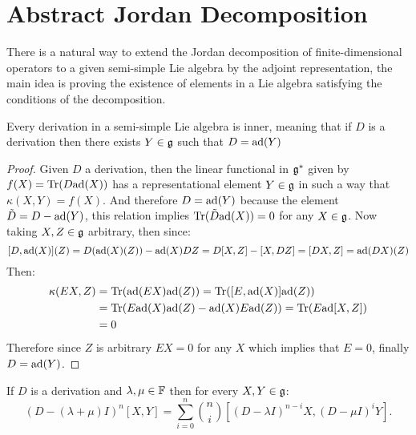 \section{Abstract Jordan Decomposition}
There is a natural way to extend the Jordan decomposition of finite-dimensional operators to a given semi-simple Lie algebra by the adjoint representation, the main idea is proving the existence of elements in a Lie algebra satisfying the conditions of the decomposition.\\
\begin{lema}
Every derivation in a semi-simple Lie algebra is inner, meaning that if $D$ is a derivation then there exists $Y \in \mathfrak{g}$ such that $D=\text{ad}(Y)$
\label{InnerDerivations}
\end{lema}
\begin{proof}
Given $D$ a derivation, then the linear functional in $\mathfrak{g}^*$ given by $f(X) = \text{Tr}(D\text{ad}(X))$ has a representational element $Y \in \mathfrak{g}$ in such a way that $\kappa(X,Y) = f(X)$. And therefore $D=\text{ad}(Y)$ because the element $\tilde{D} = D - \text{ad}(Y)$, this relation implies $\text{Tr}(\tilde{D}\text{ad}(X))=0$ for any $X \in \mathfrak{g}$. Now taking $X,Z \in \mathfrak{g}$ arbitrary, then since:
$$[D,\text{ad}(X)](Z) = D(\text{ad}(X)(Z)) - \text{ad}(X)DZ = D[X,Z] - [X,DZ] = [DX,Z] = \text{ad}(DX)(Z)$$
Then:
\begin{align*}
\kappa(EX,Z) &= \text{Tr}(\text{ad}(EX)\text{ad}(Z)) = \text{Tr}([E,\text{ad}(X)]\text{ad}(Z))\\
&= \text{Tr}(E\text{ad}(X)\text{ad}(Z) - \text{ad}(X)E\text{ad}(Z)) = \text{Tr}(E\text{ad}[X,Z])\\
&= 0
\end{align*}
Therefore since $Z$ is arbitrary $EX=0$ for any $X$ which implies that $E=0$, finally $D=\text{ad}(Y)$.
\end{proof}
\begin{lema} 
	If $D$ is a derivation and $\lambda,\mu\in \mathbb{F}$ then for every $X,Y \in \mathfrak{g}$:
	$$(D-(\lambda+\mu)I)^n[X,Y] = \sum_{i=0}^n {n \choose i}[(D-\lambda I)^{n-i}X,(D-\mu I)^iY].$$
	\label{LeibnizProductFormula}
\end{lema}
